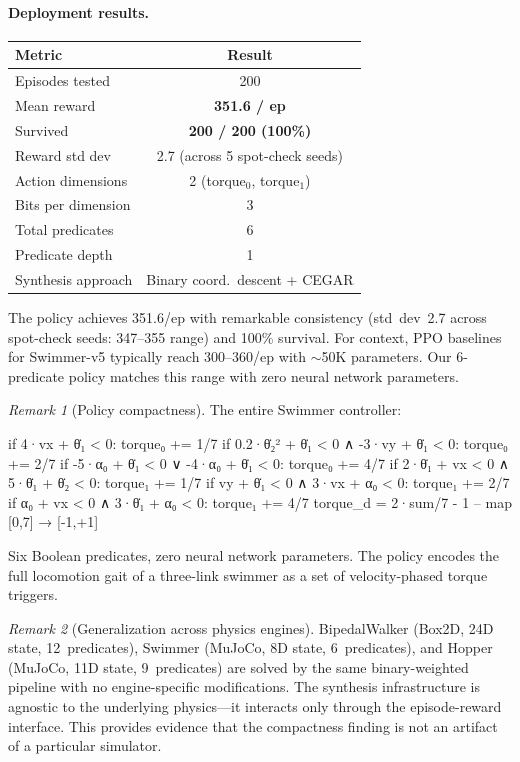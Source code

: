 \documentclass[9pt,a4paper]{article}
\theoremstyle{plain}
\theoremstyle{definition}
\theoremstyle{remark}
\newtheorem{remark}{Remark}
\begin{document}
\paragraph{Deployment results.}

\begin{center}
\begin{tabular}{lc}
\toprule
\textbf{Metric} & \textbf{Result} \\
\midrule
Episodes tested & 200 \\
Mean reward & \textbf{351.6 / ep} \\
Survived & \textbf{200 / 200 (100\%)} \\
Reward std dev & 2.7 (across 5 spot-check seeds) \\
\midrule
Action dimensions & 2 (torque$_0$, torque$_1$) \\
Bits per dimension & 3 \\
Total predicates & 6 \\
Predicate depth & 1 \\
Synthesis approach & Binary coord.\ descent + CEGAR \\
\bottomrule
\end{tabular}
\end{center}

The policy achieves 351.6/ep with remarkable consistency
(std~dev~2.7 across spot-check seeds: 347--355 range) and
100\% survival.  For context, PPO baselines for Swimmer-v5
typically reach 300--360/ep with $\sim$50K parameters.
Our 6-predicate policy matches this range with zero
neural network parameters.

\begin{remark}[Policy compactness]
The entire Swimmer controller:
\begin{spec}
  if 4·vx + θ̇₁ < 0:               torque₀ += 1/7
  if 0.2·θ̇₂² + θ̇₁ < 0 ∧ -3·vy + θ̇₁ < 0:  torque₀ += 2/7
  if -5·α₀ + θ̇₁ < 0 ∨ -4·α₀ + θ̇₁ < 0:    torque₀ += 4/7
  if 2·θ̇₁ + vx < 0 ∧ 5·θ̇₁ + θ̇₂ < 0:     torque₁ += 1/7
  if vy + θ̇₁ < 0 ∧ 3·vx + α₀ < 0:         torque₁ += 2/7
  if α₀ + vx < 0 ∧ 3·θ̇₁ + α₀ < 0:         torque₁ += 4/7
  torque_d = 2·sum/7 - 1   -- map [0,7] → [-1,+1]
\end{spec}
Six Boolean predicates, zero neural network parameters.
The policy encodes the full locomotion gait of a three-link
swimmer as a set of velocity-phased torque triggers.
\end{remark}

\begin{remark}[Generalization across physics engines]
BipedalWalker (Box2D, 24D state, 12~predicates),
Swimmer (MuJoCo, 8D state, 6~predicates), and
Hopper (MuJoCo, 11D state, 9~predicates) are solved by
the same binary-weighted pipeline with no engine-specific
modifications.  The synthesis infrastructure is agnostic
to the underlying physics---it interacts only through the
episode-reward interface.  This provides evidence that
the compactness finding is not an artifact of a particular
simulator.
\end{remark}
\end{document}
